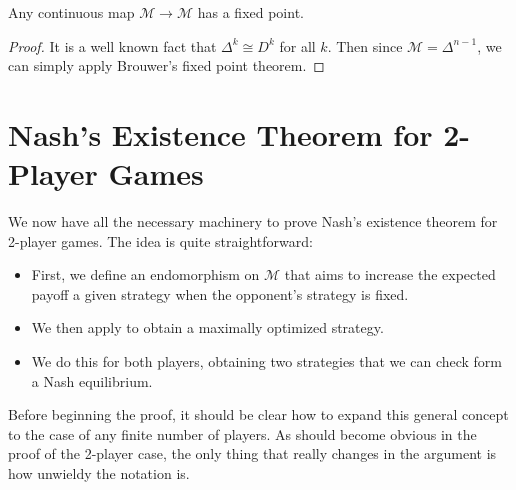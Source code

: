 \documentclass[twoside,10pt]{article}
\begin{document}
\begin{lem}
	\label{mixed-strat-fixed-pt}
	Any continuous map $\mathcal{M}\to \mathcal{M}$ has a fixed point.
\end{lem}
\begin{proof}
	It is a well known fact that $\Delta^{k}\cong D^{k}$ for all $k$. Then since $\mathcal{M}=\Delta^{n-1}$, we can simply apply Brouwer's fixed point theorem.
\end{proof}

\section{Nash's Existence Theorem for 2-Player Games}

We now have all the necessary machinery to prove Nash's existence theorem for 2-player games. The idea is quite straightforward:
\begin{itemize}
	\item First, we define an endomorphism on $\mathcal{M}$ that aims to increase the expected payoff a given strategy when the opponent's strategy is fixed.
	\item We then apply  to obtain a maximally optimized strategy.
	\item We do this for both players, obtaining two strategies that we can check form a Nash equilibrium.
\end{itemize}
Before beginning the proof, it should be clear how to expand this general concept to the case of any finite number of players. As should become obvious in the proof of the 2-player case, the only thing that really changes in the argument is how unwieldy the notation is.
\end{document}
